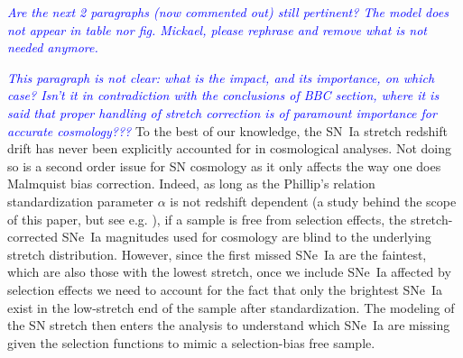 \documentclass[]{aa} %
\newcommand{\mr}[1]{{\textcolor[rgb]{0.60,0.10,0.6}{#1}}}
\newcommand{\nn}[1]{{\textcolor[rgb]{1, 0.27, 0}{#1}}}
\newcommand{\yc}[1]{{\textcolor{blue}{#1}}}
\begin{document}
\textit{\yc{Are the next 2 paragraphs (now commented out) still pertinent? The model does not appear in table nor 
fig. Mickael, please rephrase and remove what is not needed anymore.}}



\textit{\yc{This paragraph is not clear: what is the impact, and its importance, on which case? Isn't it in contradiction with the conclusions of BBC section, where it is said that proper handling of stretch correction is of paramount importance for accurate cosmology???}}
\mr{To the best of our knowledge, the SN~Ia stretch redshift drift has never
    been explicitly accounted for in cosmological analyses. Not doing so is a
    second order issue for SN cosmology as it only affects the way one does
    Malmquist bias correction. Indeed, as long as the Phillip's relation
    standardization parameter $\alpha$ is not redshift dependent (a study behind
    the scope of this paper, but see e.g. \citealt{scolnic2018a}), if a sample
    is free from selection effects, the stretch-corrected SNe~Ia magnitudes used
    for cosmology are blind to the underlying stretch distribution.  However,
    since the first missed SNe~Ia are the faintest, which are also those with
    the lowest stretch, once we include SNe~Ia affected by selection effects we
    need to account for the fact that only the brightest SNe~Ia exist in the
    low-stretch end of the sample after standardization. The modeling of the SN
    stretch then enters the analysis to understand which SNe~Ia are missing
given the selection functions to mimic a selection-bias free sample.}
\end{document}
